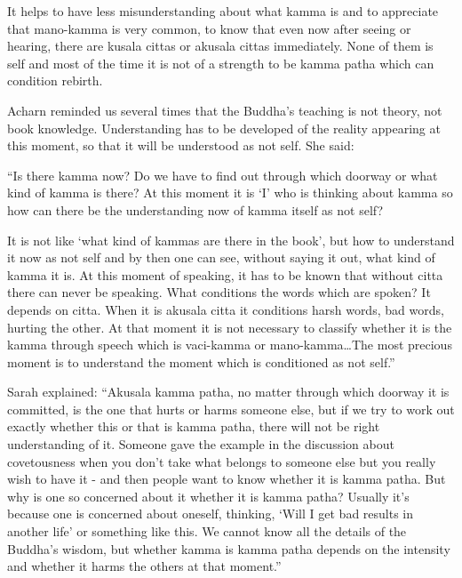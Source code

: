 It helps to have less misunderstanding about what kamma is and to appreciate 
that mano-kamma is very common, to know that even now after seeing or hearing, there are kusala cittas or akusala cittas immediately. None of them is self 
and most of the time it is not of a strength to be kamma patha which can condition rebirth. 

Acharn reminded us several times that the Buddha's teaching is not theory, not 
book knowledge. Understanding has to be developed of the reality appearing at 
this moment, so that it will be understood as not self. She said: 

``Is there kamma now? Do we have to find out through which doorway or what 
kind of kamma is there? At this moment it is `I' who is thinking about kamma 
so how can there be the understanding now of kamma itself as not self? 

It is not like `what kind of kammas are there in the book', but how to understand it now as not self and by then one can see, without saying it out, what kind 
of kamma it is. At this moment of speaking, it has to be known that without citta there can never be speaking. What conditions the words which are spoken? It 
depends on citta. When it is akusala citta it conditions harsh words, bad words, 
hurting the other. At that moment it is not necessary to classify whether it is the 
kamma through speech which is vaci-kamma or mano-kamma\ldots The most precious moment is to understand the moment which is conditioned as not self.'' 

Sarah explained: ``Akusala kamma patha, no matter through which doorway it is 
committed, is the one that hurts or harms someone else, but if we try to work 
out exactly whether this or that is kamma patha, there will not be right understanding of it. Someone gave the example in the discussion about covetousness 
when you don't take what belongs to someone else but you really wish to have 
it - and then people want to know whether it is kamma patha. But why is one so 
concerned about it whether it is kamma patha? Usually it's because one is concerned about oneself, thinking, `Will I get bad results in another life' or something like this. We cannot know all the details of the Buddha's wisdom, but 
whether kamma is kamma patha depends on the intensity and whether it harms 
the others at that moment.'' 

